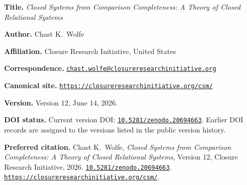 \clearpage
\thispagestyle{empty}
\begingroup
\small
\raggedright
\vspace*{0.65in}


\vspace{0.22in}

\noindent
\textbf{Title.}
\textit{Closed Systems from Comparison Completeness: A Theory of Closed
Relational Systems}

\vspace{0.10in}

\noindent
\textbf{Author.}
Chast K.~Wolfe

\vspace{0.10in}

\noindent
\textbf{Affiliation.}
Closure Research Initiative, United States

\vspace{0.10in}

\noindent
\textbf{Correspondence.}
\href{mailto:chast.wolfe@closureresearchinitiative.org}
{\texttt{chast.wolfe@closureresearchinitiative.org}}

\vspace{0.10in}

\noindent
\textbf{Canonical site.}
\href{https://closureresearchinitiative.org/csm/}
{\texttt{https://closureresearchinitiative.org/csm/}}

\vspace{0.10in}

\noindent
\textbf{Version.}
Version 12, June 14, 2026.

\vspace{0.10in}

\noindent
\textbf{DOI status.}
Current version DOI:
\href{https://doi.org/10.5281/zenodo.20694663}
{\texttt{10.5281/zenodo.20694663}}.
Earlier DOI records are assigned to the versions listed in the public
version history.

\vspace{0.10in}

\noindent
\textbf{Preferred citation.}
Chast K.~Wolfe,
\textit{Closed Systems from Comparison Completeness: A Theory of Closed
Relational Systems}, Version 12, Closure Research Initiative, 2026.
\href{https://doi.org/10.5281/zenodo.20694663}
{\texttt{10.5281/zenodo.20694663}}.
\href{https://closureresearchinitiative.org/csm/}
{\texttt{https://closureresearchinitiative.org/csm/}}.

